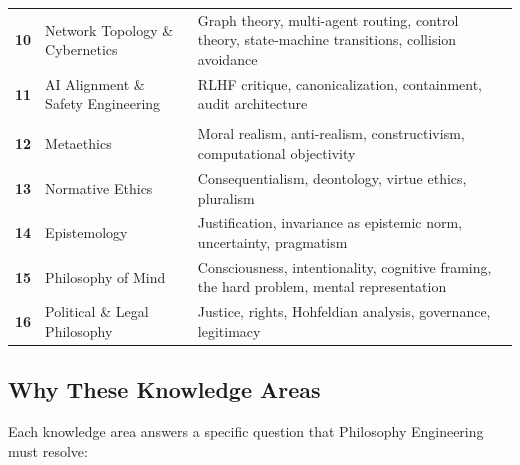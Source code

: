 \documentclass[12pt,letterpaper]{article}
\theoremstyle{definition}
\theoremstyle{plain}
\begin{document}
\begin{center}
\begin{longtable}{>{\bfseries}p{0.5cm} p{4.5cm} p{7.5cm}}
10 & Network Topology \& Cybernetics & Graph theory, multi-agent routing, control theory, state-machine transitions, collision avoidance \\
11 & AI Alignment \& Safety Engineering & RLHF critique, canonicalization, containment, audit architecture \\
\midrule
\multicolumn{3}{l}{\textbf{Tier III: Values (Philosophy)}} \\
\midrule
12 & Metaethics & Moral realism, anti-realism, constructivism, computational objectivity \\
13 & Normative Ethics & Consequentialism, deontology, virtue ethics, pluralism \\
14 & Epistemology & Justification, invariance as epistemic norm, uncertainty, pragmatism \\
15 & Philosophy of Mind & Consciousness, intentionality, cognitive framing, the hard problem, mental representation \\
16 & Political \& Legal Philosophy & Justice, rights, Hohfeldian analysis, governance, legitimacy \\
\bottomrule
\end{longtable}
\end{center}

\subsection{Why These Knowledge Areas}

Each knowledge area answers a specific question that Philosophy Engineering must resolve:
\end{document}
